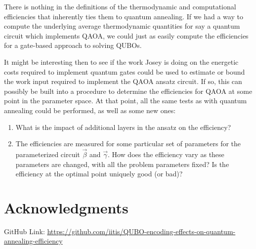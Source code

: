 \documentclass[aps,pra,amsmath,amssymb,amsfonts,lengthcheck,twocolumn,superscriptaddress]{revtex4-1}
\begin{document}
There is nothing in the definitions of the thermodynamic and computational efficiencies that inherently ties them to quantum annealing.
If we had a way to compute the underlying average thermodynamic quantities for say a quantum circuit which implements QAOA, we could just as easily compute the efficiencies for a gate-based approach to solving QUBOs.

It might be interesting then to see if the work Josey is doing on the energetic costs required to implement quantum gates could be used to estimate or bound the work input required to implement the QAOA ansatz circuit. 
If so, this can possibly be built into a procedure to determine the efficiencies for QAOA at some point in the parameter space.
At that point, all the same tests as with quantum annealing could be performed, as well as some new ones:
\begin{enumerate}
    \item What is the impact of additional layers in the ansatz on the efficiency?
    \item The efficiencies are measured for some particular set of parameters for the parameterized circuit $\vec{\beta}$ and $\vec{\gamma}$. How does the efficiency vary as these parameters are changed, with all the problem parameters fixed? Is the efficiency at the optimal point uniquely good (or bad)?
\end{enumerate}


\section{Acknowledgments}

GitHub Link: \url{https://github.com/iitis/QUBO-encoding-effects-on-quantum-annealing-efficiency}


% 

\end{document}
